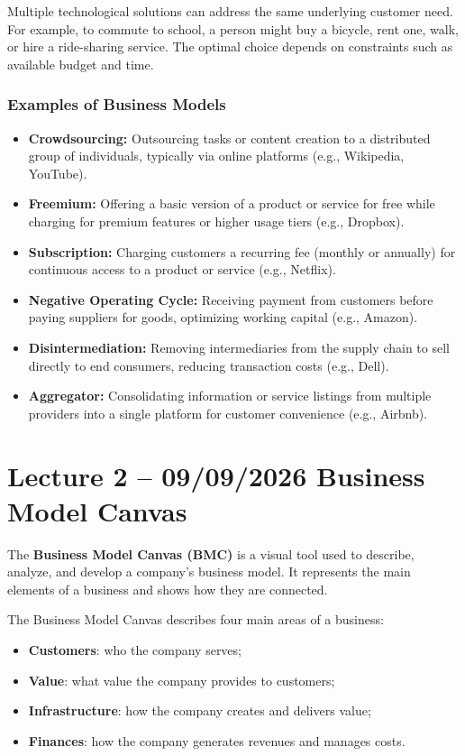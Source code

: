 \documentclass[12pt,a4paper]{report}
\begin{document}
Multiple technological solutions can address the same underlying customer need. For example, to commute to school, a person might buy a bicycle, rent one, walk, or hire a ride-sharing service. The optimal choice depends on constraints such as available budget and time.

\subsection{Examples of Business Models}

\begin{itemize}
    \item \textbf{Crowdsourcing:} Outsourcing tasks or content creation to a distributed group of individuals, typically via online platforms (e.g., Wikipedia, YouTube).
    \item \textbf{Freemium:} Offering a basic version of a product or service for free while charging for premium features or higher usage tiers (e.g., Dropbox).
    \item \textbf{Subscription:} Charging customers a recurring fee (monthly or annually) for continuous access to a product or service (e.g., Netflix).
    \item \textbf{Negative Operating Cycle:} Receiving payment from customers before paying suppliers for goods, optimizing working capital (e.g., Amazon).
    \item \textbf{Disintermediation:} Removing intermediaries from the supply chain to sell directly to end consumers, reducing transaction costs (e.g., Dell).
    \item \textbf{Aggregator:} Consolidating information or service listings from multiple providers into a single platform for customer convenience (e.g., Airbnb).
\end{itemize}

\chapter{Lecture 2 -- 09/09/2026 Business Model Canvas}


The \textbf{Business Model Canvas (BMC)} is a visual tool used to describe, analyze, and develop a company's business model. It represents the main elements of a business and shows how they are connected.

The Business Model Canvas describes four main areas of a business:

\begin{itemize}
    \item \textbf{Customers}: who the company serves;
    \item \textbf{Value}: what value the company provides to customers;
    \item \textbf{Infrastructure}: how the company creates and delivers value;
    \item \textbf{Finances}: how the company generates revenues and manages costs.
\end{itemize}
\end{document}
